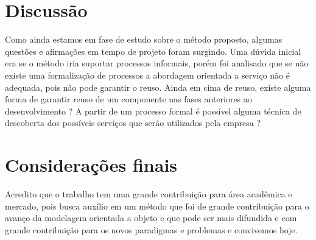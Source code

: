 \documentclass[
	article,			%
	11pt,				%
	oneside,			%
	a4paper,			%
	english,			%
	brazil,				%
	sumario=tradicional
	]{abntex2}
\begin{document}
\section{Discussão}

Como ainda estamos em fase de estudo sobre o método proposto, algumas questões e afirmações em tempo de projeto foram surgindo. Uma dúvida inicial era se o método iria suportar processos informais, porém foi analisado que se não existe uma formalização de processos a abordagem orientada a serviço não é adequada, pois não pode garantir o reuso. Ainda em cima de reuso, existe alguma forma de garantir reuso de um componente nas fases anteriores ao desenvolvimento ?
A partir de um processo formal é possível alguma técnica de descoberta dos possíveis serviços que serão utilizados pela empresa ?
% 

\section*{Considerações finais}
Acredito que o trabalho tem uma grande contribuição para área acadêmica e mercado, pois busca auxílio em um método que foi de grande contribuição para o avanço da modelagem orientada a objeto e que pode ser mais difundida e com grande contribuição para os novos paradigmas e problemas e convivemos hoje.

\postextual
\newpage

\end{document}
